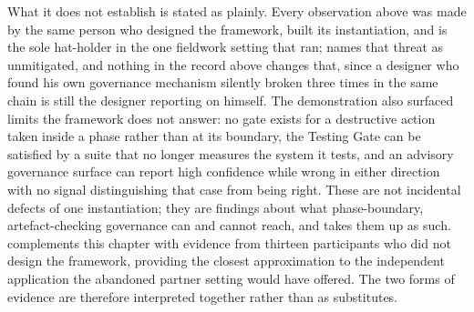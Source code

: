 What it does not establish is stated as plainly. Every observation above was made by the same person who designed the framework, built its instantiation, and is the sole hat-holder in the one fieldwork setting that ran;  names that threat as unmitigated, and nothing in the record above changes that, since a designer who found his own governance mechanism silently broken three times in the same chain is still the designer reporting on himself. The demonstration also surfaced limits the framework does not answer: no gate exists for a destructive action taken inside a phase rather than at its boundary, the Testing Gate can be satisfied by a suite that no longer measures the system it tests, and an advisory governance surface can report high confidence while wrong in either direction with no signal distinguishing that case from being right. These are not incidental defects of one instantiation; they are findings about what phase-boundary, artefact-checking governance can and cannot reach, and  takes them up as such.  complements this chapter with evidence from thirteen participants who did not design the framework, providing the closest approximation to the independent application the abandoned partner setting would have offered. The two forms of evidence are therefore interpreted together rather than as substitutes.
